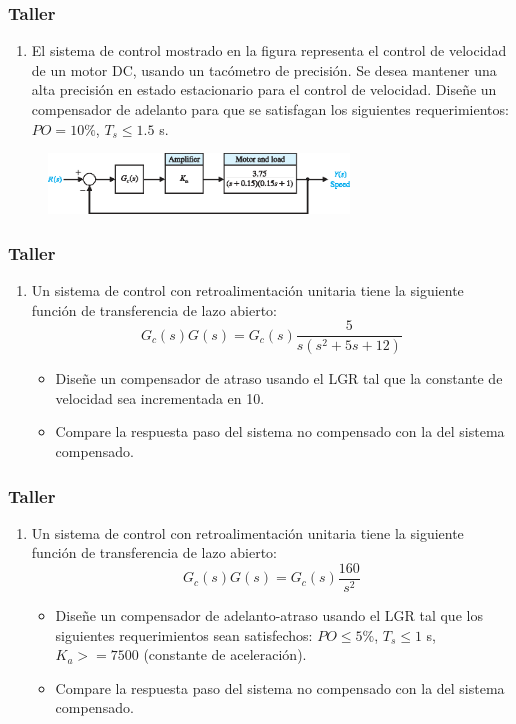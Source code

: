 \documentclass[aspectratio=169,handout]{beamer}
\theoremstyle{definition}
\theoremstyle{plain}
\theoremstyle{remark}
\newcounter{saveenumi}
\newcommand{\seti}{\setcounter{saveenumi}{\value{enumi}}}
\newcommand{\conti}{\setcounter{enumi}{\value{saveenumi}}}
\begin{document}
\begin{frame}[c]\frametitle{Taller}
	\begin{enumerate}
	 	\item El sistema de control mostrado en la figura representa el control de velocidad de un motor DC, usando un tacómetro de precisión. Se desea mantener una alta precisión en estado estacionario para el control de velocidad. Diseñe un compensador de adelanto para que se satisfagan los siguientes requerimientos: $PO = 10\%$, $T_s \leq 1.5$ s.
	 	\seti
	 \end{enumerate} 
	 \begin{figure}
	 	\includegraphics[width=8cm]{images/taller_ejericio1.eps}
	 \end{figure}
\end{frame}

\begin{frame}[c]\frametitle{Taller}
	\begin{enumerate}
		\conti
		\item Un sistema de control con retroalimentación unitaria tiene la siguiente función de transferencia de lazo abierto:
		\begin{equation*}
			G_c(s)G(s) = G_c(s)\frac{5}{s(s^2+5s+12)}
		\end{equation*}
		\begin{itemize}
			\item Diseñe un compensador de atraso usando el LGR tal que la constante de velocidad sea incrementada en 10.
			\item Compare la respuesta paso del sistema no compensado con la del sistema compensado.
		\end{itemize}
		\seti
	\end{enumerate}
\end{frame}

\begin{frame}[c]\frametitle{Taller}
	\begin{enumerate}
		\conti
		\item Un sistema de control con retroalimentación unitaria tiene la siguiente función de transferencia de lazo abierto:
		\begin{equation*}
			G_c(s)G(s) = G_c(s)\frac{160}{s^2}
		\end{equation*}
		\begin{itemize}
			\item Diseñe un compensador de adelanto-atraso usando el LGR tal que los siguientes requerimientos sean satisfechos: $PO \leq 5\%$, $T_s \leq 1$ s, $K_a >= 7500$ (constante de aceleración).
			\item Compare la respuesta paso del sistema no compensado con la del sistema compensado.
		\end{itemize}
		\seti
	\end{enumerate}
\end{frame}
\end{document}
